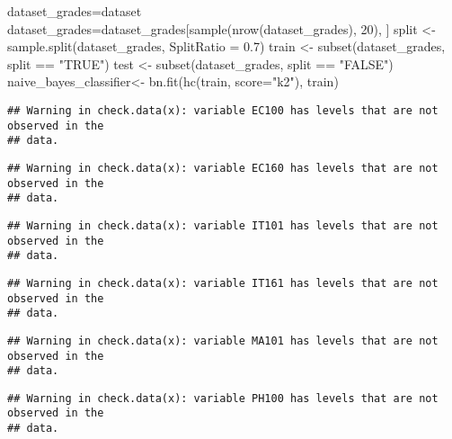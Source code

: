 \documentclass[
]{article}
\newenvironment{Shaded}{\begin{snugshade}}{\end{snugshade}}
\newcommand{\AttributeTok}[1]{\textcolor[rgb]{0.77,0.63,0.00}{#1}}
\newcommand{\DecValTok}[1]{\textcolor[rgb]{0.00,0.00,0.81}{#1}}
\newcommand{\FloatTok}[1]{\textcolor[rgb]{0.00,0.00,0.81}{#1}}
\newcommand{\FunctionTok}[1]{\textcolor[rgb]{0.00,0.00,0.00}{#1}}
\newcommand{\NormalTok}[1]{#1}
\newcommand{\OtherTok}[1]{\textcolor[rgb]{0.56,0.35,0.01}{#1}}
\newcommand{\SpecialCharTok}[1]{\textcolor[rgb]{0.00,0.00,0.00}{#1}}
\newcommand{\StringTok}[1]{\textcolor[rgb]{0.31,0.60,0.02}{#1}}
\begin{document}
\begin{Shaded}
\begin{Highlighting}[]
\NormalTok{dataset\_grades}\OtherTok{=}\NormalTok{dataset}
\NormalTok{dataset\_grades}\OtherTok{=}\NormalTok{dataset\_grades[}\FunctionTok{sample}\NormalTok{(}\FunctionTok{nrow}\NormalTok{(dataset\_grades), }\DecValTok{20}\NormalTok{), ]}
\NormalTok{split }\OtherTok{\textless{}{-}} \FunctionTok{sample.split}\NormalTok{(dataset\_grades, }\AttributeTok{SplitRatio =} \FloatTok{0.7}\NormalTok{) }
\NormalTok{train }\OtherTok{\textless{}{-}} \FunctionTok{subset}\NormalTok{(dataset\_grades, split }\SpecialCharTok{==} \StringTok{"TRUE"}\NormalTok{) }
\NormalTok{test }\OtherTok{\textless{}{-}} \FunctionTok{subset}\NormalTok{(dataset\_grades, split }\SpecialCharTok{==} \StringTok{"FALSE"}\NormalTok{)}
\NormalTok{naive\_bayes\_classifier}\OtherTok{\textless{}{-}} \FunctionTok{bn.fit}\NormalTok{(}\FunctionTok{hc}\NormalTok{(train, }\AttributeTok{score=}\StringTok{"k2"}\NormalTok{), train)}
\end{Highlighting}
\end{Shaded}

\begin{verbatim}
## Warning in check.data(x): variable EC100 has levels that are not observed in the
## data.
\end{verbatim}

\begin{verbatim}
## Warning in check.data(x): variable EC160 has levels that are not observed in the
## data.
\end{verbatim}

\begin{verbatim}
## Warning in check.data(x): variable IT101 has levels that are not observed in the
## data.
\end{verbatim}

\begin{verbatim}
## Warning in check.data(x): variable IT161 has levels that are not observed in the
## data.
\end{verbatim}

\begin{verbatim}
## Warning in check.data(x): variable MA101 has levels that are not observed in the
## data.
\end{verbatim}

\begin{verbatim}
## Warning in check.data(x): variable PH100 has levels that are not observed in the
## data.
\end{verbatim}
\end{document}
